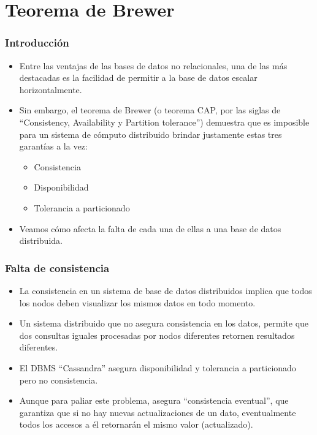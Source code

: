\section{Teorema de Brewer}

\begin{frame}
\frametitle{Introducción}
\begin{itemize}

\item	Entre las ventajas de las bases de datos no relacionales, una de las más destacadas es la facilidad de permitir a la base de datos escalar horizontalmente. \pause

\item	Sin embargo, el teorema de Brewer (o teorema CAP, por las siglas de ``Consistency, Availability y Partition tolerance'') demuestra que es imposible para un sistema de cómputo distribuido brindar justamente estas tres garantías a la vez:
		\begin{itemize}
			\item	Consistencia
			\item	Disponibilidad
			\item	Tolerancia a particionado
		\end{itemize}
		\pause
\item	Veamos cómo afecta la falta de cada una de ellas a una base de datos distribuida.

\end{itemize}
\end{frame}

\begin{frame}
\frametitle{Falta de consistencia}
\begin{itemize}

	\item	La consistencia en un sistema de base de datos distribuidos implica que todos los nodos deben visualizar los mismos datos en todo momento. \pause
	\item	Un sistema distribuido que no asegura consistencia en los datos, permite que dos consultas iguales procesadas por nodos diferentes retornen resultados diferentes. \pause
	\item	El DBMS ``Cassandra'' asegura disponibilidad y tolerancia a particionado pero no consistencia. \pause
	\item	Aunque para paliar este problema, asegura ``consistencia eventual'', que garantiza que si no hay nuevas actualizaciones de un dato, eventualmente todos los accesos a él retornarán el mismo valor (actualizado).

\end{itemize}
\end{frame}

